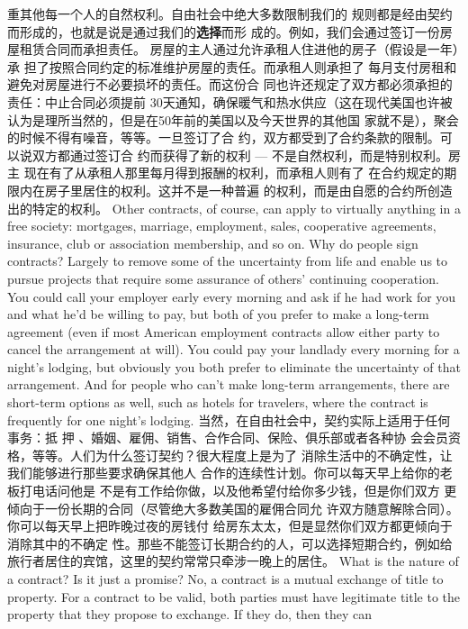 \begin{paracol}{2}
重其他每一个人的自然权利。自由社会中绝大多数限制我们的
规则都是经由契约而形成的，也就是说是通过我们的\textbf{选择}而形
成的。例如，我们会通过签订一份房屋租赁合同而承担责任。
房屋的主人通过允许承租人住进他的房子（假设是一年）承
担了按照合同约定的标准维护房屋的责任。而承租人则承担了
每月支付房租和避免对房屋进行不必要损坏的责任。而这份合
同也许还规定了双方都必须承担的责任：中止合同必须提前
30天通知，确保暖气和热水供应（这在现代美国也许被认为是理所当然的，但是在50年前的美国以及今天世界的其他国
家就不是），聚会的时候不得有噪音，等等。一旦签订了合
约，双方都受到了合约条款的限制。可以说双方都通过签订合
约而获得了新的权利 --- 不是自然权利，而是特别权利。房主
现在有了从承租人那里每月得到报酬的权利，而承租人则有了
在合约规定的期限内在房子里居住的权利。这并不是一种普遍
的权利，而是由自愿的合约所创造出的特定的权利。
\switchcolumn*
Other contracts, of course, can apply to virtually anything in
a free society: mortgages, marriage, employment, sales, cooperative agreements, insurance, club or association membership,
and so on. Why do people sign contracts? Largely to remove some of the uncertainty from life and enable us to pursue projects that require some assurance of others' continuing cooperation. You could call your employer early every morning and ask
if he had work for you and what he'd be willing to pay, but both
of you prefer to make a long-term agreement (even if most
American employment contracts allow either party to cancel
the arrangement at will). You could pay your landlady every
morning for a night's lodging, but obviously you both prefer to
eliminate the uncertainty of that arrangement. And for people
who can't make long-term arrangements, there are short-term
options as well, such as hotels for travelers, where the contract
is frequently for one night's lodging.
\switchcolumn
当然，在自由社会中，契约实际上适用于任何事务：抵
押 、婚姻、雇佣、销售、合作合同、保险、俱乐部或者各种协
会会员资格，等等。人们为什么签订契约？很大程度上是为了
消除生活中的不确定性，让我们能够进行那些要求确保其他人
合作的连续性计划。你可以每天早上给你的老板打电话问他是
不是有工作给你做，以及他希望付给你多少钱，但是你们双方
更倾向于一份长期的合同（尽管绝大多数美国的雇佣合同允
许双方随意解除合同）。你可以每天早上把昨晚过夜的房钱付
给房东太太，但是显然你们双方都更倾向于消除其中的不确定
性。那些不能签订长期合约的人，可以选择短期合约，例如给
旅行者居住的宾馆，这里的契约常常只牵涉一晚上的居住。
\switchcolumn*
What is the nature of a contract? Is it just a promise? No, a
contract is a mutual exchange of title to property. For a contract
to be valid, both parties must have legitimate title to the property that they propose to exchange. If they do, then they can

\end{paracol}

